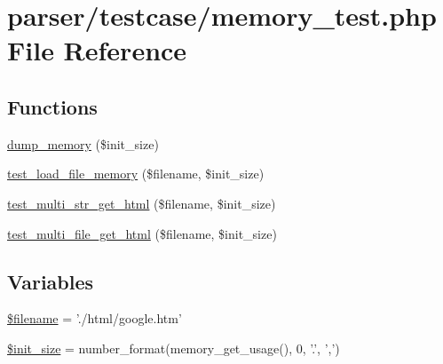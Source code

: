 \hypertarget{memory__test_8php}{\section{parser/testcase/memory\+\_\+test.php File Reference}
\label{memory__test_8php}
}
\subsection*{Functions}
\begin{DoxyCompactItemize}
\item 
\hyperlink{memory__test_8php_a8bfd033724dbbf7faa2f0e3cd60027ec}{dump\+\_\+memory} (\$init\+\_\+size)
\item 
\hyperlink{memory__test_8php_a3545970652bbb90c9abaf3db57618744}{test\+\_\+load\+\_\+file\+\_\+memory} (\$filename, \$init\+\_\+size)
\item 
\hyperlink{memory__test_8php_af17e18362ccd7ff015e9f01f0598efac}{test\+\_\+multi\+\_\+str\+\_\+get\+\_\+html} (\$filename, \$init\+\_\+size)
\item 
\hyperlink{memory__test_8php_a03fc6318721e88e5a65a22339934d91c}{test\+\_\+multi\+\_\+file\+\_\+get\+\_\+html} (\$filename, \$init\+\_\+size)
\end{DoxyCompactItemize}
\subsection*{Variables}
\begin{DoxyCompactItemize}
\item 
\hyperlink{memory__test_8php_a0722441477f957078ee2437054556cbc}{\$filename} = './html/google.\+htm'
\item 
\hyperlink{memory__test_8php_a0ba66905edc5f735e4b423e74e3ba1e6}{\$init\+\_\+size} = number\+\_\+format(memory\+\_\+get\+\_\+usage(), 0, '.', ',')
\end{DoxyCompactItemize}


